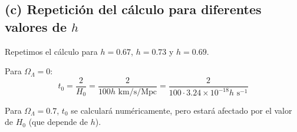\documentclass{article}
\begin{document}
\subsection*{(c) Repetición del cálculo para diferentes valores de \(h\)}
Repetimos el cálculo para \(h = 0.67\), \(h = 0.73\) y \(h = 0.69\).

Para \(\Omega_\Lambda = 0\):
\[
t_0 = \frac{2}{H_0} = \frac{2}{100 h \text{ km/s/Mpc}} = \frac{2}{100 \cdot 3.24 \times 10^{-18} h \text{ s}^{-1}}
\]

Para \(\Omega_\Lambda = 0.7\), \(t_0\) se calculará numéricamente, pero estará afectado por el valor de \(H_0\) (que depende de \(h\)).
\end{document}
